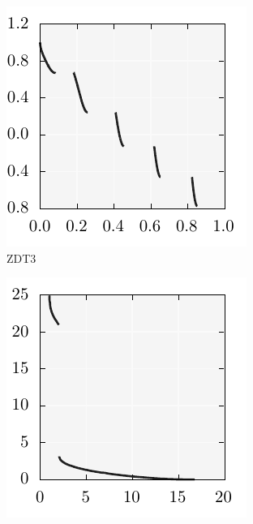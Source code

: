 \documentclass{stdlocal}
\begin{document}
\begin{figure}[t]
\begin{subfigure}[b]{0.24\textwidth}
        \includegraphics[width=\textwidth]{../../plots/zdt3_tessellation.pdf}
        \caption{ZDT3}
      \end{subfigure}
      \begin{subfigure}[b]{0.24\textwidth}
        \center
        \includegraphics[width=\textwidth]{../../plots/poloni2_tessellation.pdf}

\end{subfigure}
\end{figure}
\end{document}
